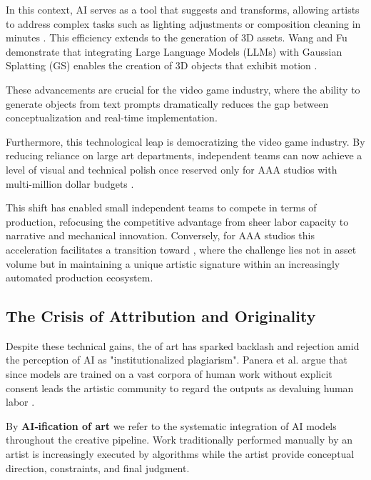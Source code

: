 \documentclass[9pt,a4paper,twocolumn,twoside]{rho-class/rho}
\begin{document}
        In this context, AI serves as a tool that suggests and transforms, allowing artists to address complex tasks such as lighting adjustments or composition cleaning in minutes \cite{calderon}. This efficiency extends to the generation of 3D assets. Wang and Fu demonstrate that integrating Large Language Models (LLMs) with Gaussian Splatting (GS) enables the creation of  3D objects that exhibit  motion \cite{wenqing}. 

        These advancements are crucial for the video game industry, where the ability to generate  objects from text prompts dramatically reduces the gap between conceptualization and real-time implementation. 

        Furthermore, this technological leap is democratizing the video game industry. By reducing reliance on large art departments, independent teams can now achieve a level of visual and technical polish once reserved only for AAA studios with multi-million dollar budgets \cite{condorelli}.

        This shift has enabled small independent teams to compete in terms of  production, refocusing the competitive advantage from sheer labor capacity to narrative and mechanical innovation. Conversely, for AAA studios this acceleration facilitates a transition toward , where the challenge lies not in asset volume but in maintaining a unique artistic signature within an increasingly automated production ecosystem. 

    \subsection{The Crisis of Attribution and Originality}

        Despite these technical gains, the   of art  has sparked backlash and rejection amid the perception of AI as "institutionalized plagiarism". Panera et al. argue that since models are trained on a vast corpora of human work without explicit consent leads the artistic community to regard the outputs as devaluing human labor \cite{panera}.

        \begin{note}
            By \textbf{AI‑ification of art} we refer to the systematic integration of AI models throughout the creative pipeline. 
            Work traditionally performed manually by an artist is increasingly executed by algorithms while the artist provide conceptual direction, constraints, and final judgment.
        \end{note}
\end{document}
